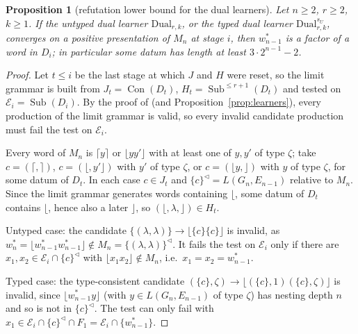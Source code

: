 \documentclass[11pt]{article}
\numberwithin{equation}{section}
\theoremstyle{plain}
\newtheorem{proposition}[theorem]{Proposition}
\theoremstyle{definition}
\theoremstyle{remark}
\theoremstyle{plain}
\newcommand{\eps}{\lambda}
\newcommand{\Lc}{^{\lhd}}
\newcommand{\Sub}{\operatorname{Sub}}
\newcommand{\Con}{\operatorname{Con}}
\newcommand{\Lfl}{\lfloor}
\newcommand{\Rfl}{\rfloor}
\newcommand{\Lce}{\lceil}
\newcommand{\Rce}{\rceil}
\begin{document}
\begin{proposition}[refutation lower bound for the dual learners]
\label{prop:dual-refutation}
Let $n\ge2$, $r\ge2$, $k\ge1$.  If the untyped dual learner
$\mathrm{Dual}_{r,k}$, or the typed dual learner $\mathrm{Dual}^{s_U}_{r,k}$,
converges on a positive presentation of $M_n$ at stage $i$, then $w^*_{n-1}$
is a factor of a word in $D_i$; in particular some datum has length at least
$3\cdot2^{n-1}-2$.
\end{proposition}
\begin{proof}
Let $t\le i$ be the last stage at which $J$ and $H$ were reset, so the limit
grammar is built from $J_t=\Con(D_t)$, $H_t=\Sub^{\le r+1}(D_t)$ and tested on
$\mathcal E_i=\Sub(D_i)$.  By the proof of \citet[Thm.~3]{ky2017} (and
Proposition~\ref{prop:learners}), every production of the limit grammar is
valid, so every invalid candidate production must fail the test on $\mathcal E_i$.

Every word of $M_n$ is $\Lce y\Rce$ or $\Lfl yy'\Rfl$ with at least one of
$y,y'$ of type $\zeta$; take $c=(\Lce,\Rce)$, $c=(\Lfl,y'\Rfl)$ with $y'$ of type
$\zeta$, or $c=(\Lfl y,\Rfl)$ with $y$ of type $\zeta$, for some datum of
$D_t$.  In each case $c\in J_t$ and $\{c\}\Lc=L(G_n,E_{n-1})$ relative to
$M_n$.  Since the limit grammar generates words containing $\Lfl$, some
datum of $D_t$ contains $\Lfl$, hence also a later $\Rfl$, so
$(\Lfl,\eps,\Rfl)\in H_t$.

Untyped case: the candidate $\{(\eps,\eps)\}\to\Lfl\{c\}\{c\}\Rfl$ is invalid,
as $w^*_n=\Lfl w^*_{n-1}w^*_{n-1}\Rfl\notin M_n=\{(\eps,\eps)\}\Lc$.  It fails the
test on $\mathcal E_i$ only if there are $x_1,x_2\in \mathcal E_i\cap\{c\}\Lc$ with
$\Lfl x_1x_2\Rfl\notin M_n$, i.e.\ $x_1=x_2=w^*_{n-1}$.

Typed case: the type-consistent candidate
$(\{c\},\zeta)\to\Lfl(\{c\},1)(\{c\},\zeta)\Rfl$ is invalid, since
$\Lfl w^*_{n-1}y\Rfl$ (with $y\in L(G_n,E_{n-1})$ of type $\zeta$) has nesting
depth $n$ and so is not in $\{c\}\Lc$.  The test can only fail with
$x_1\in \mathcal E_i\cap\{c\}\Lc\cap F_1=\mathcal E_i\cap\{w^*_{n-1}\}$.
\end{proof}
\end{document}
